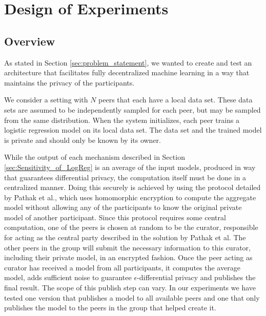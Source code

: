 \chapter{Design of Experiments}

\section{Overview}
\label{sec:experiment_overview}
As stated in Section \ref{sec:problem_statement}, we wanted to create and test an architecture that facilitates fully decentralized machine learning in a way that maintains the privacy of the participants. 

We consider a setting with $N$ peers that each have a local data set. These data sets are assumed to be independently sampled for each peer, but may be sampled from the same distribution. When the system initializes, each peer trains a logistic regression model on its local data set. The data set and the trained model is private and should only be known by its owner.


While the output of each mechanism described in Section \ref{sec:Sensitivity_of_LogReg} is an average of the input models, produced in way that guarantees differential privacy, the computation itself must be done in a centralized manner. Doing this securely is achieved by using the protocol detailed by Pathak et al., which uses homomorphic encryption to compute the aggregate model without allowing any of the participants to know the original private model of another participant\citep{pathak2010diffprivhomo}. Since this protocol requires some central computation, one of the peers is chosen at random to be the curator, responsible for acting as the central party described in the solution by Pathak et al. The other peers in the group will submit the necessary information to this curator, including their private model, in an encrypted fashion. Once the peer acting as curator has received a model from all participants, it computes the average model, adds sufficient noise to guarantee $\epsilon$-differential privacy and publishes the final result. The scope of this publish step can vary. In our experiments we have tested one version that publishes a model to all available peers and one that only publishes the model to the peers in the group that helped create it.

